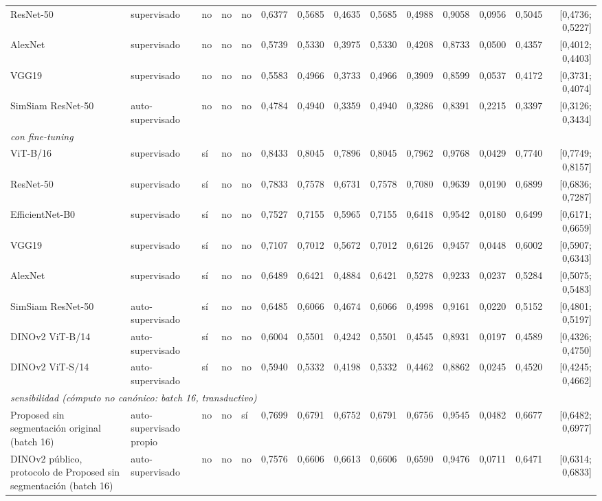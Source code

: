\begin{table}[ht]
\begin{tabular}{@{}lllllrrrrrrrrr@{}}
ResNet-50 & supervisado & no & no & no & 0,6377 & 0,5685 & 0,4635 & 0,5685 & 0,4988 & 0,9058 & 0,0956 & 0,5045 & [0,4736; 0,5227] \\
AlexNet & supervisado & no & no & no & 0,5739 & 0,5330 & 0,3975 & 0,5330 & 0,4208 & 0,8733 & 0,0500 & 0,4357 & [0,4012; 0,4403] \\
VGG19 & supervisado & no & no & no & 0,5583 & 0,4966 & 0,3733 & 0,4966 & 0,3909 & 0,8599 & 0,0537 & 0,4172 & [0,3731; 0,4074] \\
SimSiam ResNet-50 & auto-supervisado & no & no & no & 0,4784 & 0,4940 & 0,3359 & 0,4940 & 0,3286 & 0,8391 & 0,2215 & 0,3397 & [0,3126; 0,3434] \\
\midrule
\multicolumn{14}{l}{\textit{con fine-tuning}} \\
\midrule
ViT-B/16 & supervisado & sí & no & no & 0,8433 & 0,8045 & 0,7896 & 0,8045 & 0,7962 & 0,9768 & 0,0429 & 0,7740 & [0,7749; 0,8157] \\
ResNet-50 & supervisado & sí & no & no & 0,7833 & 0,7578 & 0,6731 & 0,7578 & 0,7080 & 0,9639 & 0,0190 & 0,6899 & [0,6836; 0,7287] \\
EfficientNet-B0 & supervisado & sí & no & no & 0,7527 & 0,7155 & 0,5965 & 0,7155 & 0,6418 & 0,9542 & 0,0180 & 0,6499 & [0,6171; 0,6659] \\
VGG19 & supervisado & sí & no & no & 0,7107 & 0,7012 & 0,5672 & 0,7012 & 0,6126 & 0,9457 & 0,0448 & 0,6002 & [0,5907; 0,6343] \\
AlexNet & supervisado & sí & no & no & 0,6489 & 0,6421 & 0,4884 & 0,6421 & 0,5278 & 0,9233 & 0,0237 & 0,5284 & [0,5075; 0,5483] \\
SimSiam ResNet-50 & auto-supervisado & sí & no & no & 0,6485 & 0,6066 & 0,4674 & 0,6066 & 0,4998 & 0,9161 & 0,0220 & 0,5152 & [0,4801; 0,5197] \\
DINOv2 ViT-B/14 & auto-supervisado & sí & no & no & 0,6004 & 0,5501 & 0,4242 & 0,5501 & 0,4545 & 0,8931 & 0,0197 & 0,4589 & [0,4326; 0,4750] \\
DINOv2 ViT-S/14 & auto-supervisado & sí & no & no & 0,5940 & 0,5332 & 0,4198 & 0,5332 & 0,4462 & 0,8862 & 0,0245 & 0,4520 & [0,4245; 0,4662] \\
\midrule
\multicolumn{14}{l}{\textit{sensibilidad (cómputo no canónico: batch 16, transductivo)}} \\
\midrule
Proposed sin segmentación original (batch 16) & auto-supervisado propio & no & no & sí & 0,7699 & 0,6791 & 0,6752 & 0,6791 & 0,6756 & 0,9545 & 0,0482 & 0,6677 & [0,6482; 0,6977] \\
DINOv2 público, protocolo de Proposed sin segmentación (batch 16) & auto-supervisado & no & no & no & 0,7576 & 0,6606 & 0,6613 & 0,6606 & 0,6590 & 0,9476 & 0,0711 & 0,6471 & [0,6314; 0,6833] \\

\end{tabular}
\end{table}
